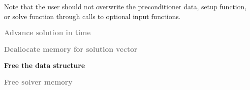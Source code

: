 \begin{Steps}
  Note that the user should not overwrite the preconditioner data, setup function,
  or solve function through calls to {\cvspgmr} optional input functions.

\item
  \textcolor{gray}{\bf Advance solution in time}

\item
  \textcolor{gray}{\bf Deallocate memory for solution vector}

\item \label{i:bandpre_free}
  {\bf Free the {\cvbandpre} data structure}


\item
  \textcolor{gray}{\bf Free solver memory}
  
\end{Steps}

